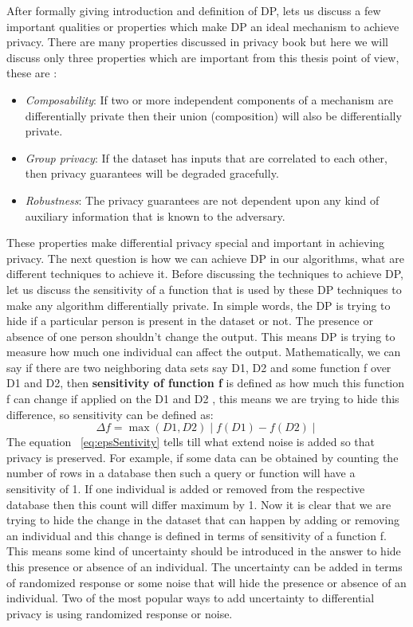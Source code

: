 After formally giving introduction and definition of DP, lets us discuss a few important qualities or properties which make DP an ideal mechanism to achieve privacy. There are many properties discussed in privacy book \cite{80} but here we will discuss only three properties which are important from this thesis point of view, these are :
\begin{itemize}
    \item  \textit{Composability}: If two or more independent components of a mechanism are differentially private then their union (composition) will also be differentially private.
    \item  \textit{Group privacy}: If the dataset has inputs that are correlated to each other, then privacy guarantees will be degraded gracefully.
    \item  \textit{Robustness}: The privacy guarantees are not dependent upon any kind of auxiliary information that is known to the adversary.
\end{itemize}

These properties make differential privacy special and important in achieving privacy. The next question is how we can achieve DP in our algorithms, what are different techniques to achieve it. Before discussing the techniques to achieve DP, let us discuss the sensitivity of a function that is used by these DP techniques to make any algorithm differentially private. In simple words, the DP is trying to hide if a particular person is present in the dataset or not. The presence or absence of one person shouldn't change the output. This means DP is trying to measure how much one individual can affect the output. Mathematically, we can say if there are two neighboring data sets say D1, D2 and some function f over D1 and D2, then \textbf{sensitivity of function f} is defined as how much this function f can change if applied on the D1 and D2 \cite{2}, this means we are trying to hide this difference, so sensitivity can be defined as:
\begin{equation}
\Delta f = \max(D1,D2) \mid f(D1)-f(D2) \mid
\label{eq:epsSentivity}
\end{equation}
The equation ~\ref{eq:epsSentivity} tells till what extend noise is added so that privacy is preserved. For example, if some data can be obtained by counting the number of rows in a database then such a query or function will have a sensitivity of 1. If one individual is added or removed from the respective database then this count will differ maximum by 1. Now it is clear that we are trying to hide the change in the dataset that can happen by adding or removing an individual and this change is defined in terms of sensitivity of a function f. This means some kind of uncertainty should be introduced in the answer to hide this presence or absence of an individual. The uncertainty can be added in terms of randomized response or some noise that will hide the presence or absence of an individual. Two of the most popular ways to add uncertainty to differential privacy is using randomized response or noise.

